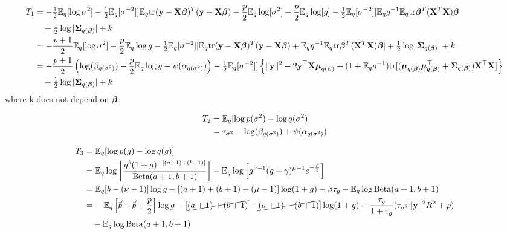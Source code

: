 \documentclass{amsart}[12pt]
\theoremstyle{definition}
\begin{document}
\begin{align*}
	T_1 & = -\tfrac{1}{2} \mathbb{E}_q [\log \sigma^2] -\tfrac{1}{2} \mathbb{E}_q [\sigma^{-2}]] \mathbb{E}_q \text{tr} ({\bf y} - {\bf X} {\boldsymbol \beta})^T ({\bf y} - {\bf X} {\boldsymbol \beta})            
	- \frac{p}{2} \mathbb{E}_q \log [\sigma^2] - \frac{p}{2} \mathbb{E}_q \log [g] - \tfrac{1}{2} \mathbb{E}_q [\sigma^{-2}]] \mathbb{E}_q g^{-1} \mathbb{E}_q \text{tr} {\boldsymbol\beta}^T ({\bf X}^T {\bf X}) {\boldsymbol \beta} \\
	    & \quad + \tfrac{1}{2} \log |{\boldsymbol \Sigma}_{q({\boldsymbol \beta})}| + k                                                                         \\
	    & = -\frac{p + 1}{2} \mathbb{E}_q [\log \sigma^2] - \frac{p}{2} \mathbb{E}_q \log g                                                    
	-\tfrac{1}{2} \mathbb{E}_q [\sigma^{-2}] [\mathbb{E}_q \text{tr} ({\bf y} - {\bf X} {\boldsymbol \beta})^T ({\bf y} - {\bf X} {\boldsymbol \beta}) + \mathbb{E}_q g^{-1} \mathbb{E}_q \text{tr} {\boldsymbol\beta}^T ({\bf X}^T {\bf X}) {\boldsymbol \beta}]
	+ \tfrac{1}{2} \log |{\boldsymbol \Sigma}_{q({\boldsymbol \beta})}| + k \\
	    & = -\frac{p + 1}{2} \left (\log (\beta_{q(\sigma^2)}) - \frac{p}{2} \mathbb{E}_q \log g - \psi(\alpha_{q(\sigma^2)}) \right ) 
	- \tfrac{1}{2} \mathbb{E}_q [\sigma^{-2}]] \left \{ \| {\bf y}\|^2 - 2 {\bf y}^\top {\bf X} {\boldsymbol\mu}_{q({\boldsymbol \beta})} + (1 + \mathbb{E}_q g^{-1}) \text{tr}[({\boldsymbol \mu}_{q({\boldsymbol \beta})} {\boldsymbol \mu}_{q({\boldsymbol \beta})}^\top + {\boldsymbol \Sigma}_{q({\boldsymbol \beta})}) {\bf X}^\top {\bf X}] \right \}  \\
	    & \quad + \tfrac{1}{2} \log |{\boldsymbol \Sigma}_{q({\boldsymbol \beta})}| + k                                                                         
\end{align*}
where k does not depend on ${\boldsymbol \beta}$.

\begin{align*}
	T_2 & = \mathbb{E}_q [\log p(\sigma^2) - \log q(\sigma^2)]                               \\
	    & = \tau_{\sigma^2} - \log(\beta_{q(\sigma^2)}) + \psi(\alpha_{q(\sigma^2)}) 
\end{align*}

\begin{align*}
	T_3 & = \mathbb{E}_q [\log p(g) - \log q(g)]                                                                                                                     \\
	    & = \mathbb{E}_q \log \left [ \frac{g^b (1 + g)^{-[(a + 1) + (b + 1)]}}{\text{Beta}(a + 1, b + 1)} \right ] -                                                      
	\mathbb{E}_q \log \left [ g^{\nu - 1} (g + \gamma)^{\mu - 1} e^{-\frac{\beta}{g}} \right ] \\
	    & = \mathbb{E}_q [b - (\nu - 1)] \log g - [(a + 1) + (b + 1) - (\mu - 1)] \log (1 + g) - \beta \tau_g                                                        
	- \mathbb{E}_q \log \text{Beta}(a + 1,  b + 1) \\
	    & = \quad \mathbb{E}_q \left [\cancel{b} - \cancel{b} + \frac{p}{2} \right ] \log g - [\cancel{(a + 1) + (b + 1)} - \cancel{(a + 1) - (b + 1)}] \log (1 + g) 
	- \frac{\tau_g}{1 + \tau_g} (\tau_{\sigma^2} \|{\bf y}\|^2 R^2 + p)\\
	    & \quad - \mathbb{E}_q \log \text{Beta}(a + 1,  b + 1)                                                                                                             \\
\end{align*}
\end{document}
